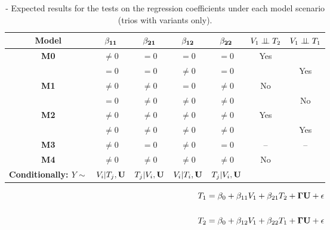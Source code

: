 \documentclass[12pt]{report}
\begin{document}
\begin{table}[H]
\centering
\caption{- Expected results for the tests on the regression coefficients under each model scenario (trios with variants only).}
\begin{tabular}{|c||cccc|c|c|}
\hline
\bf Model  & $\bf\beta_{11}$  &  $\bf\beta_{21}$   & $\bf\beta_{12}$    & $\bf\beta_{22}$    & $ V_1 \perp \!\!\! \perp T_2$    & $V_1 \perp \!\!\! \perp T_1$    \\ \hline \hline
\bf M0      &  $\neq 0$            & $= 0$                  & $=0$                    & $=0$                    & Yes                          &           \\ \hline 
               &  $= 0$                 & $= 0$                  & $\neq 0$                & $= 0$                  &                                & Yes           \\ \hline
\bf M1      &  $\neq 0$            &  $\neq 0$             & $= 0$                    & $\neq 0$              & No                            &            \\ \hline
               &  $ = 0$                &  $\neq0$              & $\neq0$                & $\neq 0$              &                                & No       \\ \hline
\bf M2      &   $\neq0$            &  $\neq 0$             & $\neq0$                & $\neq0$               & Yes                          &           \\ \hline
               &   $\neq0$            &  $\neq 0$             & $\neq0$                & $\neq0$               &                                & Yes          \\ \hline
\bf M3      &   $\neq 0$           &  $= 0$                 & $\neq0$                & $=0$                   & --                           &   --         \\ \hline
\bf M4      &   $\neq0$            &  $\neq 0$             & $\neq0$                & $\neq0$               & No                          &             \\ \hline \hline
\bf Conditionally:  $Y \sim$& $V_i|T_j,{\bf U}$  &  $T_j|V_i, {\bf U}$   & $V_i| T_i, {\bf U}$    & $T_j|V_i,{\bf U}$    &            \\ \hline 
\end{tabular}
\end{table}

\begin{eqnarray}
T_1 = \beta_0 +\beta_{11}V_1+\beta_{21}T_2+{\bf \Gamma U}+ \epsilon \\
\nonumber\\
T_2 = \beta_0 +\beta_{12}V_1+\beta_{22}T_1+{\bf \Gamma U}+ \epsilon 
\end{eqnarray}
\end{document}
